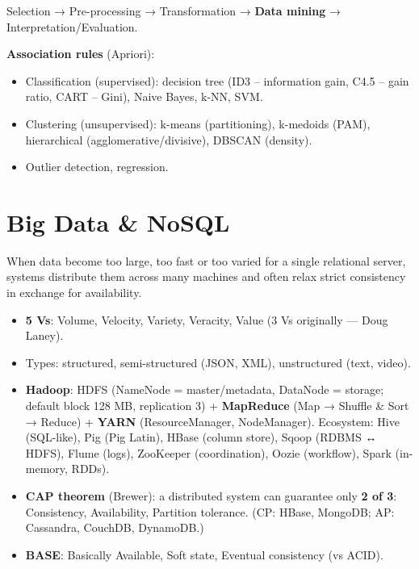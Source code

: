 Selection → Pre-processing → Transformation → \textbf{Data mining} → Interpretation/Evaluation.

\textbf{Association rules} (Apriori):



\begin{itemize}
\tightlist
\item
  Classification (supervised): decision tree (ID3 -- information gain, C4.5 -- gain ratio, CART -- Gini), Naive Bayes, k-NN, SVM.
\item
  Clustering (unsupervised): k-means (partitioning), k-medoids (PAM), hierarchical (agglomerative/divisive), DBSCAN (density).
\item
  Outlier detection, regression.
\end{itemize}

\needspace{125pt}

\hypertarget{p2-04--11-big-data--nosql}{%
\section{Big Data \& NoSQL}\label{p2-04--11-big-data--nosql}}

When data become too large, too fast or too varied for a single relational server, systems distribute them
across many machines and often relax strict consistency in exchange for availability.

\begin{itemize}
\tightlist
\item
  \textbf{5 Vs}: Volume, Velocity, Variety, Veracity, Value (3 Vs originally --- Doug Laney).
\item
  Types: structured, semi-structured (JSON, XML), unstructured (text, video).
\item
  \textbf{Hadoop}: HDFS (NameNode = master/metadata, DataNode = storage; default block 128 MB, replication 3) + \textbf{MapReduce} (Map → Shuffle \& Sort → Reduce) + \textbf{YARN} (ResourceManager, NodeManager). Ecosystem: Hive (SQL-like), Pig (Pig Latin), HBase (column store), Sqoop (RDBMS ↔ HDFS), Flume (logs), ZooKeeper (coordination), Oozie (workflow), Spark (in-memory, RDDs).
\item
  \textbf{CAP theorem} (Brewer): a distributed system can guarantee only \textbf{2 of 3}: Consistency, Availability, Partition tolerance. (CP: HBase, MongoDB; AP: Cassandra, CouchDB, DynamoDB.)
\item
  \textbf{BASE}: Basically Available, Soft state, Eventual consistency (vs ACID).
\end{itemize}

